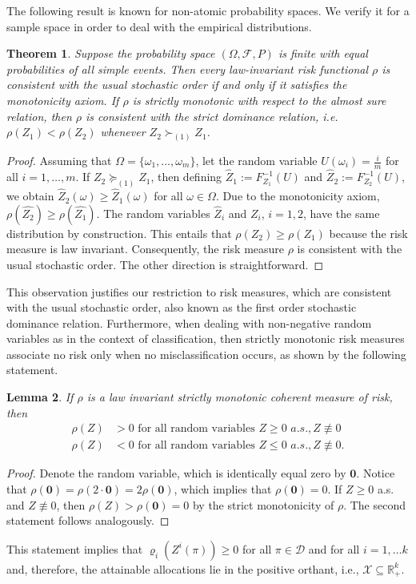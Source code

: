 \documentclass[10pt,letterpaper]{article}
\newcommand{\Fc}{\mathcal{F}}
\newcommand{\Xc}{\mathcal{X}}
\newcommand{\1}{1{\hskip -2.55 pt}\hbox{I}}
\newcommand{\fsd}{\succeq_{(1)}}
\newcommand{\sfsd}{\succ_{(1)}}
\newtheorem{theorem}{Theorem}
\newtheorem{proof}{Proof}
\newtheorem{lemma}[theorem]{Lemma}
\begin{document}
The following result is known for non-atomic probability spaces. We verify it for a sample space in order to deal with the empirical distributions.
\begin{theorem}
\label{t:consistency} Suppose  the probability space $(\Omega,\Fc,P)$ is finite with equal probabilities of all simple events.  Then every law-invariant risk
functional $\rho$ is consistent with the usual stochastic order if and only if it satisfies the monotonicity
axiom. If $\rho$ is strictly monotonic with respect to the almost sure relation, then $\rho$ is consistent with the strict dominance relation, i.e. $\rho(Z_1)<\rho(Z_2)$ whenever $Z_2\sfsd Z_1$.
\end{theorem}
\begin{proof}
Assuming that $\Omega=\{ \omega_1,\dots,\omega_m\}$, let the random variable $U(\omega_i)=\frac{i}{m}$ for all $i=1,\dots, m$.
If $Z_2\fsd Z_1$, then defining $\hat{Z}_1:=F_{Z_1}^{-1}(U)$ and $\hat{Z}_2:=F_{Z_2}^{-1}(U)$,
we obtain $\hat{Z}_2(\omega)\geq \hat{Z}_1(\omega)$ for all $\omega\in \Omega$. Due to the monotonicity axiom, $\rho(\hat{Z_2}) \ge \rho(\hat{Z_1})$. The random variables $\hat{Z}_i$ and $Z_i$,  $i=1,2$, have the same distribution by construction. This entails that $\rho({Z_2}) \ge \rho({Z_1})$ because the risk measure is law invariant.
Consequently, the risk measure $\rho$ is consistent with the usual stochastic order. The other direction is straightforward.
\end{proof}
This observation justifies our restriction to risk measures, which are consistent with the usual stochastic order, also known as the first order stochastic dominance relation. Furthermore, when dealing with non-negative random variables as in the context of classification, then strictly monotonic risk measures associate no risk only when no misclassification occurs, as shown by the following statement.
\begin{lemma}
If $\rho$ is a law invariant strictly monotonic coherent measure of risk, then
\begin{equation}
\label{a:norm}
\begin{aligned}
\rho(Z) &> 0 \text{ for all random variables } Z\geq 0\,\, a.s., Z\not\equiv 0\\
\rho(Z) & < 0  \text{ for all random variables } Z\leq 0\,\, a.s., Z\not\equiv 0.
\end{aligned}
\end{equation}
\end{lemma}
\begin{proof}
Denote the random variable, which is identically equal zero by $\mathbf{0}$. Notice that $\rho(\mathbf{0}) = \rho(2\cdot\mathbf{0}) = 2\rho(\mathbf{0})$, which implies that  $\rho(\mathbf{0})=0$.
If $Z\geq 0$ a.s. and $Z\not\equiv 0$, then $\rho(Z)> \rho(\mathbf{0})=0$ by the strict monotonicity of $\rho$.
The second statement follows analogously.
\end{proof}
 This statement implies that  $\varrho_i(Z^i(\pi))\geq 0$ for all $\pi\in\mathcal D$ and for all $i=1,\dots k$  and, therefore, the attainable allocations lie in the positive orthant, i.e.,   $\Xc\subseteq \mathbb R^k_+$.
\end{document}
